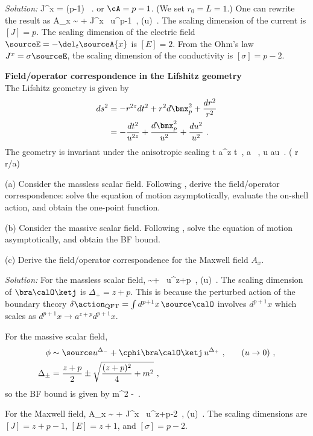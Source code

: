 {\color{blue} 
\textit{Solution:}
\be
%
\bra J^x \ketj = (p-1)  ~.
%
\ee
or $\cA=p-1$. (We set $r_0=L=1$.) One can rewrite the result as
\be
%
A_x \sim {} +  \bra J^x \ketj\, u^{p-1}~,
\quad (u)~.
%
\ee
The scaling dimension of the current is $[J]=p$. The scaling dimension of the electric field $\sourceE = -\del_t \sourceA{x}$ is $[E]=2$. From the Ohm's law $J^x = \sigma \sourceE$, the scaling dimension of the conductivity is $[\sigma]=p-2$.
}

\begin{prob}
\label{prob:field_op_Lifshitz}
\textbf{Field/operator correspondence in the Lifshitz geometry}
\cite{Kachru:2008yh2,Taylor:2015glc} \\
The Lifshitz geometry is given by 
\begin{align}
%
ds^2 &= -r^{2z}dt^2 + r^2 d\bmx_p^2 + \frac{dr^2}{r^2} \\
&= - \frac{dt^2}{u^{2z}} + \frac{d\bmx_p^2}{u^2} + \frac{du^2}{u^2}~.
%
\end{align}
The geometry is invariant under the anisotropic scaling
\be
%
t \rightarrow a^z t~, \bmx \rightarrow a \bmx~, u \rightarrow au~. \quad
(  r \rightarrow r/a)
%
\ee

\noindent
(a) Consider the massless scalar field. Following , derive the field/operator correspondence: solve the equation of motion asymptotically, evaluate the on-shell action, and obtain the one-point function.

\noindent
(b) Consider the massive scalar field. Following , solve the equation of motion asymptotically, and obtain the BF bound.

\noindent
(c) Derive the field/operator correspondence for the Maxwell field $A_x$.\\
\end{prob}

{\color{blue} 
\textit{Solution:}
For the massless scalar field,
\be
%
\phi \sim \source +  \bra \calO \ketj\, u^{z+p}~,
\quad (u)~.
%
\ee
The scaling dimension of $\bra \calO \ketj$ is $\Delta_+ = z+p$. This is because the perturbed action of the boundary theory $ \delta \action_\text{QFT} = \int d^{p+1}x\, \source \calO $ involves $d^{p+1}x$ which scales as $d^{p+1}x \rightarrow a^{z+p}d^{p+1}x$.

For the massive scalar field,
\begin{alignat}{2}
%
\phi &\sim\source u^{\Delta_-} + \cphi \bra\calO\ketj\, u^{\Delta_+}~,
&\quad& (u\rightarrow0)~,
 \\
\Delta_\pm &= \frac{z+p}{2} \pm \sqrt{\frac{(z+p)^2}{4}+m^2}~,&&
%
\end{alignat}
so the BF bound is given by
\be
%
m^2 \geq -~.
%
\ee

For the Maxwell field,
\be
%
A_x \sim {} +  \bra J^x \ketj\, u^{z+p-2}~,
\quad (u)~.
%
\ee
The scaling dimensions are $[J] = z+p-1$, $[E]=z+1$, and $[\sigma]=p-2$.
}


